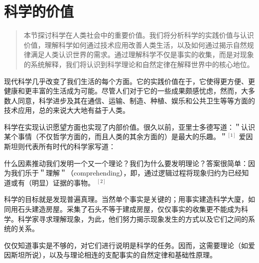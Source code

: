 \section{科学的价值}

\begin{quotation}
本节探讨科学在人类社会中的重要价值。我们将分析科学的实践价值与认识价值，理解科学如何通过技术应用改善人类生活，以及如何通过揭示自然规律满足人类认识世界的需求。通过理解科学不仅是事实的收集，而是对现象的系统解释，我们将认识到科学理论和自然定律在解释世界中的核心地位。
\end{quotation}

现代科学几乎改变了我们生活的每个方面。它的实践价值在于，它使得更方便、更健康和更丰富的生活成为可能。尽管人们对于它的一些成果颇感忧虑，然而，大多数人同意，科学进步及其在通信、运输、制造、种植、娱乐和公共卫生等等方面的技术应用，总的来说大大地有益于人类。

科学在实现认识愿望方面也实现了内部价值。很久以前，亚里士多德写道：＂认识某个事情（不仅哲学方面的，而且人类的其余方面的）是最大的乐趣。＂${ }^{[1]}$ 爱因斯坦则代表所有时代的科学家写道：

\begin{displayquote}
什么因素推动我们发明一个又一个理论？我们为什么要发明理论？答案很简单：因为我们乐于＂理解＂（comprehending），即，通过逻辑过程将现象归约为已经知道或有（明显）证据的事物。 ${ }^{[2]}$
\end{displayquote}

科学的目标就是发现普遍真理。当然单个事实是关键的；用事实建造科学大廈，如同用石头建造房屋。采集了石头不等于建成房屋，仅仅事实的收集更不能成为科学。科学家寻求理解现象，为此，他们努力揭示现象发生的方式以及它们之间的系统的关系。

仅仅知道事实是不够的，对它们进行说明是科学的任务。因而，这需要理论（如爱因斯坦所说），以及与理论相连的支配事实的自然定律和基础性原理。 

